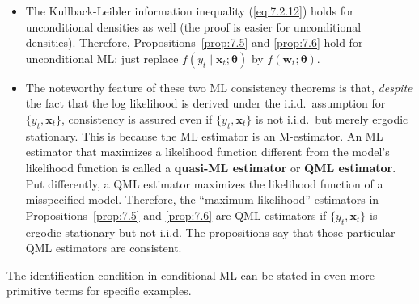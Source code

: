 \begin{itemize}
\item The Kullback-Leibler information inequality (\ref{eq:7.2.12}) holds for unconditional densities as well (the proof is easier for unconditional densities). Therefore, Propositions~\ref{prop:7.5} and \ref{prop:7.6} hold for unconditional ML; just replace $f(y_t \mid \mathbf{x}_t; \bm{\theta})$ by $f(\mathbf{w}_t; \bm{\theta})$.

\item The noteworthy feature of these two ML consistency theorems is that, \emph{despite} the fact that the log likelihood is derived under the i.i.d.\ assumption for $\{y_t, \mathbf{x}_t\}$, consistency is assured even if $\{y_t, \mathbf{x}_t\}$ is not i.i.d.\ but merely ergodic stationary. This is because the ML estimator is an M-estimator. An ML estimator that maximizes a likelihood function different from the model's likelihood function is called a \textbf{quasi-ML estimator} or \textbf{QML estimator}. Put differently, a QML estimator maximizes the likelihood function of a misspecified model. Therefore, the ``maximum likelihood'' estimators in Propositions~\ref{prop:7.5} and \ref{prop:7.6} are QML estimators if $\{y_t, \mathbf{x}_t\}$ is ergodic stationary but not i.i.d. The propositions say that those particular QML estimators are consistent.
\end{itemize}

The identification condition in conditional ML can be stated in even more primitive terms for specific examples.

